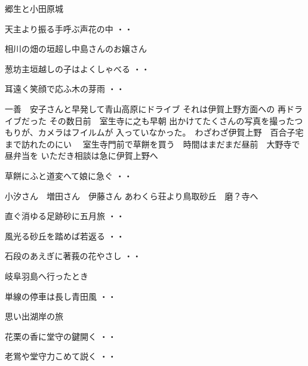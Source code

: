 \vspace{0.6cm}
郷生と小田原城
\begin{shiika}天主より振る手呼ぶ声花の中
\hfill{・・}\end{shiika}
\vspace{0.6cm}
相川の畑の垣超し中島さんのお嬢さん
\begin{shiika}葱坊主垣越しの子はよくしゃべる
\hfill{・・}\end{shiika}
\begin{shiika}耳遠く笑顔で応ふ木の芽雨
\hfill{・・}\end{shiika}
\vspace{0.6cm}
一善　安子さんと早発して青山高原にドライブ
それは伊賀上野方面への
再ドライブだった
その数日前　室生寺に之も早朝
出かけてたくさんの写真を撮ったつもりが、カメラはフイルムが
入っていなかった。　わざわざ伊賀上野　百合子宅まで訪れたのにい
　室生寺門前で草餅を買う　時間はまだまだ昼前　大野寺で昼弁当を
いただき相談は急に伊賀上野へ
\begin{shiika}草餅にふと道変へて娘に急ぐ
\hfill{・・}\end{shiika}
\vspace{0.6cm}
小汐さん　増田さん　伊藤さん あわくら荘より鳥取砂丘　磨？寺へ
\begin{shiika}直ぐ消ゆる足跡砂に五月旅
\hfill{・・}\end{shiika}
\begin{shiika}風光る砂丘を踏めば若返る
\hfill{・・}\end{shiika}
\begin{shiika}石段のあえぎに著莪の花やさし
\hfill{・・}\end{shiika}
\vspace{0.6cm}
岐阜羽島へ行ったとき
\begin{shiika}単線の停車は長し青田風
\hfill{・・}\end{shiika}
\vspace{0.6cm}
思い出湖岸の旅
\begin{shiika}花栗の香に堂守の鍵開く
\hfill{・・}\end{shiika}
\begin{shiika}老鴬や堂守力こめて説く
\hfill{・・}\end{shiika}
